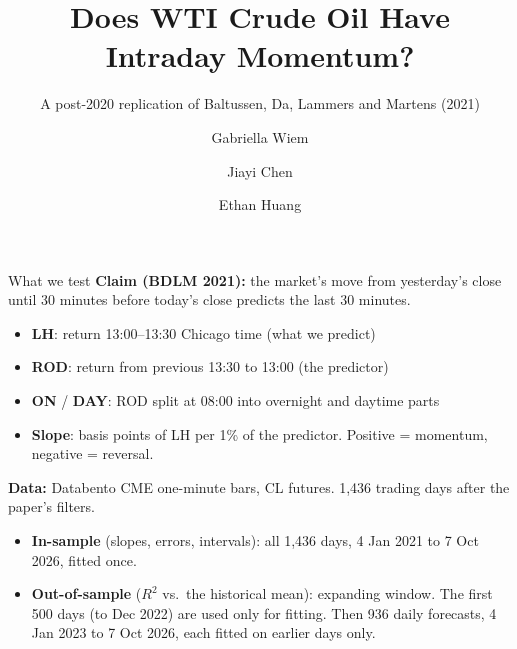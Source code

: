 \documentclass[aspectratio=169,10pt]{beamer}
\title{Does WTI Crude Oil Have Intraday Momentum?}
\subtitle{A post-2020 replication of Baltussen, Da, Lammers and Martens (2021)}
\author{Gabriella Wiem \and Jiayi Chen \and Ethan Huang}
\institute{FINM 37000, Group 3}
\date{}
\begin{document}
\maketitle
\addtocounter{framenumber}{1}

\begin{frame}[t]{What we test}
  \textbf{Claim (BDLM 2021):} the market's move from yesterday's close until 30 minutes before today's close predicts the last 30 minutes.
  \begin{itemize}
    \item \textbf{LH}: return 13:00--13:30 Chicago time (what we predict)
    \item \textbf{ROD}: return from previous 13:30 to 13:00 (the predictor)
    \item \textbf{ON} / \textbf{DAY}: ROD split at 08:00 into overnight and daytime parts
    \item \textbf{Slope}: basis points of LH per 1\% of the predictor. Positive = momentum, negative = reversal.
  \end{itemize}
  \textbf{Data:} Databento CME one-minute bars, CL futures. 1,436 trading days after the paper's filters.
  \begin{itemize}
    \item \textbf{In-sample} (slopes, errors, intervals): all 1,436 days, 4 Jan 2021 to 7 Oct 2026, fitted once.
    \item \textbf{Out-of-sample} ($R^2$ vs.\ the historical mean): expanding window. The first 500 days (to Dec 2022) are used only for fitting. Then 936 daily forecasts, 4 Jan 2023 to 7 Oct 2026, each fitted on earlier days only.
  \end{itemize}
\end{frame}
\end{document}
